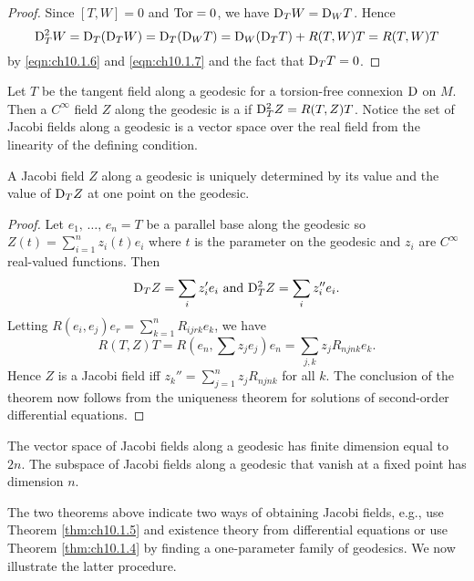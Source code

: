 \documentclass[../main]{subfiles}
\begin{document}
\begin{proof}
Since $[T,W]=0$ and $\mathrm{Tor}=0$, we have $\mathrm{D}_T W = \mathrm{D}_W T$. Hence
\[
\mathrm{D}_T^2 W 
= 
\mathrm{D}_T(\mathrm{D}_T W)
=
\mathrm{D}_T(\mathrm{D}_W T)
=
\mathrm{D}_W(\mathrm{D}_T T) + R(T,W)T
=
R(T,W)T
\]
by \eqref{eqn:ch10.1.6} and \eqref{eqn:ch10.1.7} and the fact that $\mathrm{D}_T T = 0$.
\end{proof}



Let $T$ be the tangent field along a geodesic for a torsion-free connexion $\mathrm{D}$ on $M$. Then a $C^\infty$ field $Z$ along the geodesic is a  if $\mathrm{D}_T^2 Z = R(T,Z)T$. Notice the set of Jacobi fields along a geodesic is a vector space over the real field from the linearity of the defining condition.



\begin{theorem} \label{thm:ch10.1.5}
A Jacobi field $Z$ along a geodesic is uniquely determined by its value and the value of $\mathrm{D}_T Z$ at one point on the geodesic.
\end{theorem}

\begin{proof}
Let $e_1,\, \hdots,\, e_n = T$ be a parallel base along the geodesic so \newline$Z(t)=\displaystyle \sum_{i=1}^n z_i(t) e_i$ where $t$ is the parameter on the geodesic and $z_i$ are $C^\infty$ real-valued functions. Then \[\mathrm{D}_T Z = \sum_i z_i' e_i\text{ and }\mathrm{D}_T^2 Z = \sum_i z_i'' e_i.\] Letting $R(e_i,e_j)e_r=\displaystyle\sum_{k=1}^n R_{ijrk}e_k$, we have \[R(T,Z)T=R(e_n,\sum z_je_j)e_n=\sum_{j,k}z_j R_{njnk} e_k.\] Hence $Z$ is a Jacobi field iff $z_k''=\displaystyle\sum_{j=1}^n z_j R_{njnk}$ for all $k$. The conclusion of the theorem now follows from the uniqueness theorem for solutions of second-order differential equations.
\end{proof}



\begin{corollary} \label{cor:ch10.1.6}
The vector space of Jacobi fields along a geodesic has finite dimension equal to $2n$. The subspace of Jacobi fields along a geodesic that vanish at a fixed point has dimension $n$.
\end{corollary}



The two theorems above indicate two ways of obtaining Jacobi fields, e.g., use Theorem \ref{thm:ch10.1.5} and existence theory from differential equations or use Theorem \ref{thm:ch10.1.4} by finding a one-parameter family of geodesics. We now illustrate the latter procedure.
\end{document}
